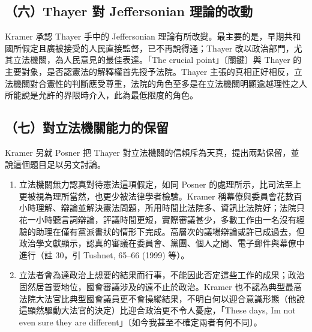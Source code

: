 \subsection{（六）Thayer 對 Jeffersonian 理論的改動}

Kramer 承認 Thayer 手中的 Jeffersonian 理論有所改變。最主要的是，早期共和國所假定且廣被接受的人民直接監督，已不再說得通；Thayer 改以政治部門，尤其立法機關，為人民意見的最佳表達。「The crucial point」〔關鍵〕與 Thayer 的主要對象，是否認憲法的解釋權首先授予法院。Thayer 主張的真相正好相反，立法機關對合憲性的判斷應受尊重，法院的角色至多是在立法機關明顯逾越理性之人所能說是允許的界限時介入，此為最低限度的角色。

\subsection{（七）對立法機關能力的保留}

Kramer 另就 Posner 把 Thayer 對立法機關的信賴斥為天真，提出兩點保留，並說這個題目足以另文討論。

\begin{enumerate}
\def\labelenumi{\arabic{enumi}.}
\tightlist
\item
  立法機關無力認真對待憲法這項假定，如同 Posner 的處理所示，比司法至上更被視為理所當然，也更少被法律學者檢驗。Kramer 稱幕僚與委員會花數百小時理解、辯論並解決憲法問題，所用時間比法院多、資訊比法院好；法院只花一小時聽言詞辯論，評議時間更短，實際審議甚少，多數工作由一名沒有經驗的助理在僅有黨派書狀的情形下完成。高層次的議場辯論或許已成過去，但政治學文獻顯示，認真的審議在委員會、黨團、個人之間、電子郵件與幕僚中進行（註 30，引 Tushnet,  65--66 (1999) 等）。
\item
  立法者會為達政治上想要的結果而行事，不能因此否定這些工作的成果；政治固然居首要地位，國會審議涉及的遠不止於政治。Kramer 也不認為典型最高法院大法官比典型國會議員更不會操縱結果，不明白何以迎合意識形態（他說這顯然驅動大法官的決定）比迎合政治更不令人憂慮，「These days, I\textquotesingle m not even sure they are different」〔如今我甚至不確定兩者有何不同〕。
\end{enumerate}

